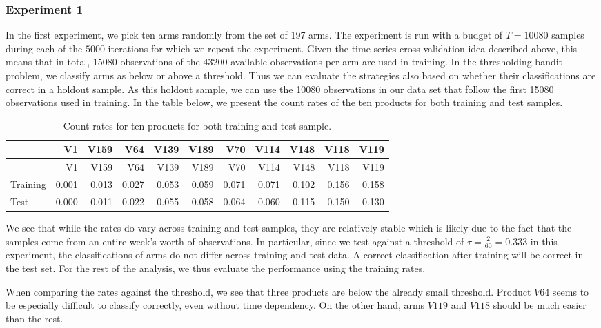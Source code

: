 \documentclass[11pt,]{article}
\begin{document}
\subsubsection{Experiment 1}\label{experiment-1}

In the first experiment, we pick ten arms randomly from the set of 197
arms. The experiment is run with a budget of \(T=10080\) samples during
each of the \(5000\) iterations for which we repeat the experiment.
Given the time series cross-validation idea described above, this means
that in total, \(15080\) observations of the \(43200\) available
observations per arm are used in training. In the thresholding bandit
problem, we classify arms as below or above a threshold. Thus we can
evaluate the strategies also based on whether their classifications are
correct in a holdout sample. As this holdout sample, we can use the
10080 observations in our data set that follow the first 15080
observations used in training. In the table below, we present the count
rates of the ten products for both training and test samples.

\begin{longtable}[]{@{}lrrrrrrrrrr@{}}
\caption{Count rates for ten products for both training and test
sample.}\tabularnewline
\toprule
& V1 & V159 & V64 & V139 & V189 & V70 & V114 & V148 & V118 &
V119\tabularnewline
\midrule
\endfirsthead
\toprule
& V1 & V159 & V64 & V139 & V189 & V70 & V114 & V148 & V118 &
V119\tabularnewline
\midrule
\endhead
Training & 0.001 & 0.013 & 0.027 & 0.053 & 0.059 & 0.071 & 0.071 & 0.102
& 0.156 & 0.158\tabularnewline
Test & 0.000 & 0.011 & 0.022 & 0.055 & 0.058 & 0.064 & 0.060 & 0.115 &
0.150 & 0.130\tabularnewline
\bottomrule
\end{longtable}

We see that while the rates do vary across training and test samples,
they are relatively stable which is likely due to the fact that the
samples come from an entire week's worth of observations. In particular,
since we test against a threshold of \(\tau = \frac{2}{60} = 0.333\) in
this experiment, the classifications of arms do not differ across
training and test data. A correct classification after training will be
correct in the test set. For the rest of the analysis, we thus evaluate
the performance using the training rates.

When comparing the rates against the threshold, we see that three
products are below the already small threshold. Product \(V64\) seems to
be especially difficult to classify correctly, even without time
dependency. On the other hand, arms \(V119\) and \(V118\) should be much
easier than the rest.
\end{document}
